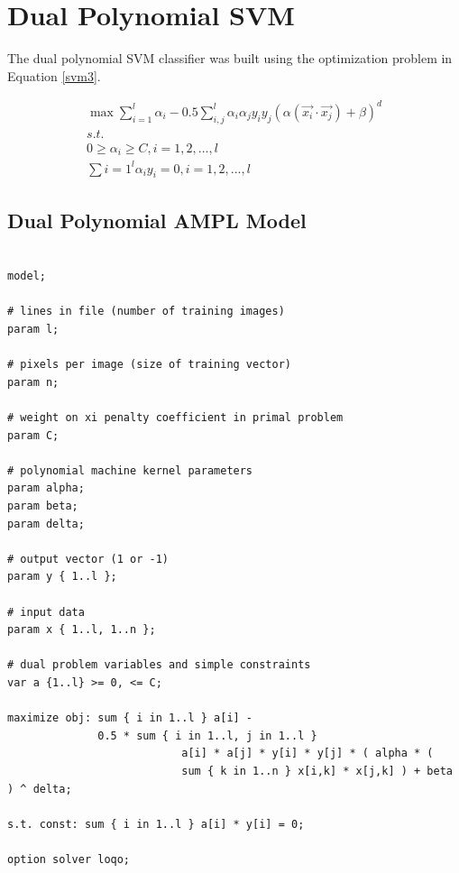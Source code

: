 \documentclass{article}
\begin{document}
\section{Dual Polynomial SVM}\label{model3}

The dual polynomial SVM classifier was built using the optimization problem in Equation \ref{svm3}.

\begin{equation}\label{svm3}
\begin{split}
\max \sum_{i=1}^l \alpha_i - 0.5 \sum_{i,j}^l \alpha_i \alpha_j y_i y_j \left( \alpha \left( \vec{x_i} \cdot \vec{x_j} \right) + \beta \right)^d \\
s.t. \\
0 \ge \alpha_i \ge C , i = 1,2,...,l \\
\sum{i=1}^l \alpha_i y_i = 0 , i = 1,2,...,l
\end{split}
\end{equation}

\subsection{Dual Polynomial AMPL Model}

\begin{verbatim}

model;

# lines in file (number of training images)
param l;

# pixels per image (size of training vector)
param n;

# weight on xi penalty coefficient in primal problem
param C;

# polynomial machine kernel parameters
param alpha;
param beta;
param delta;

# output vector (1 or -1)
param y { 1..l };

# input data
param x { 1..l, 1..n };

# dual problem variables and simple constraints
var a {1..l} >= 0, <= C;

maximize obj: sum { i in 1..l } a[i] -
              0.5 * sum { i in 1..l, j in 1..l }
                           a[i] * a[j] * y[i] * y[j] * ( alpha * (
                           sum { k in 1..n } x[i,k] * x[j,k] ) + beta ) ^ delta;

s.t. const: sum { i in 1..l } a[i] * y[i] = 0;

option solver loqo;

\end{verbatim}
\end{document}
